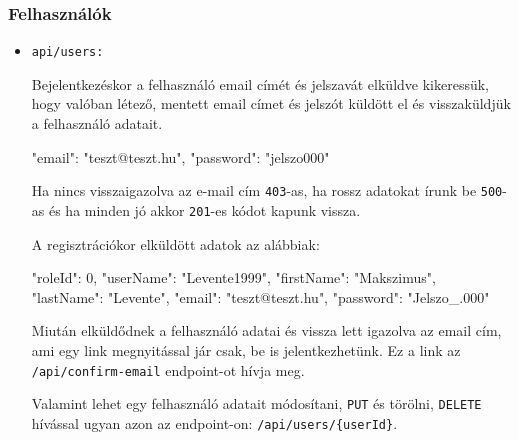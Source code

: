 \subsubsection{Felhasználók}
\begin{itemize}[label={$\bullet$}, topsep=0pt, itemsep=0pt, leftmargin=15pt]
    \item[] {\nolinkurl{api/users:}}
          \begin{addmargin}[\parindent]{0pt}
              Bejelentkezéskor a felhasználó email címét és jelszavát elküldve kikeressük, hogy valóban létező, mentett email címet és jelszót küldött el és visszaküldjük a felhasználó adatait. 
              \begin{json}
{
    "email": "teszt@teszt.hu",
    "password": "jelszo000"
}
              \end{json}
              Ha nincs visszaigazolva az e-mail cím \nolinkurl{403}-as, ha rossz adatokat írunk be \nolinkurl{500}-as és ha minden jó akkor \nolinkurl{201}-es kódot kapunk vissza. \newline

              A regisztrációkor elküldött adatok az alábbiak:

              \begin{json}
{
    "roleId": 0,
    "userName": "Levente1999",
    "firstName": "Makszimus",
    "lastName": "Levente",
    "email": "teszt@teszt.hu",
    "password": "Jelszo_.000"
}
              \end{json}

              Miután elküldődnek a felhasználó adatai és vissza lett igazolva az email cím, ami egy link megnyitással jár csak, be is jelentkezhetünk. Ez a link az \nolinkurl{/api/confirm-email} endpoint-ot hívja meg. \newline

              Valamint lehet egy felhasználó adatait módosítani, \nolinkurl{PUT} és törölni, \nolinkurl{DELETE} hívással ugyan azon az endpoint-on: \nolinkurl{/api/users/{userId}}.
          \end{addmargin}
\end{itemize}

